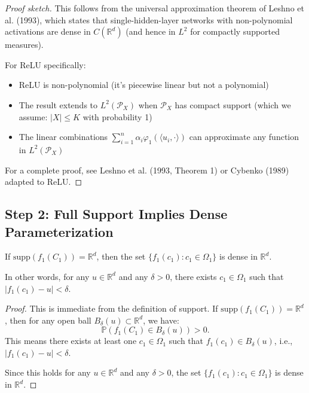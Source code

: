 \begin{proof}[Proof sketch]
This follows from the universal approximation theorem of Leshno et al. (1993), which states that single-hidden-layer networks with non-polynomial activations are dense in $C(\mathbb{R}^d)$ (and hence in $L^2$ for compactly supported measures).

For ReLU specifically:
\begin{itemize}
\item ReLU is non-polynomial (it's piecewise linear but not a polynomial)
\item The result extends to $L^2(\mathcal{P}_X)$ when $\mathcal{P}_X$ has compact support (which we assume: $|X| \le K$ with probability 1)
\item The linear combinations $\sum_{i=1}^n \alpha_i \varphi_1(\langle u_i, \cdot\rangle)$ can approximate any function in $L^2(\mathcal{P}_X)$
\end{itemize}

For a complete proof, see Leshno et al. (1993, Theorem 1) or Cybenko (1989) adapted to ReLU.
\end{proof}

\subsection{Step 2: Full Support Implies Dense Parameterization}

\begin{lemma}
\label{lem:dense-parameterization}
If $\text{supp}(f_1(C_1)) = \mathbb{R}^d$, then the set $\{f_1(c_1) : c_1 \in \Omega_1\}$ is dense in $\mathbb{R}^d$.

In other words, for any $u \in \mathbb{R}^d$ and any $\delta > 0$, there exists $c_1 \in \Omega_1$ such that $|f_1(c_1) - u| < \delta$.
\end{lemma}

\begin{proof}
This is immediate from the definition of support. If $\text{supp}(f_1(C_1)) = \mathbb{R}^d$, then for any open ball $B_\delta(u) \subset \mathbb{R}^d$, we have:
\[
\mathbb{P}(f_1(C_1) \in B_\delta(u)) > 0.
\]
This means there exists at least one $c_1 \in \Omega_1$ such that $f_1(c_1) \in B_\delta(u)$, i.e., $|f_1(c_1) - u| < \delta$.

Since this holds for any $u \in \mathbb{R}^d$ and any $\delta > 0$, the set $\{f_1(c_1) : c_1 \in \Omega_1\}$ is dense in $\mathbb{R}^d$.
\end{proof}

